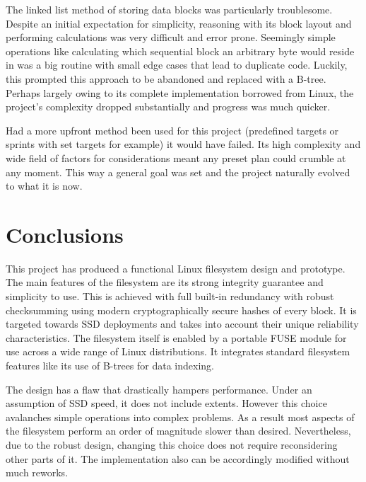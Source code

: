         The linked list method of storing data blocks was particularly
        troublesome. Despite an initial expectation for simplicity, reasoning
        with its block layout and performing calculations was very difficult
        and error prone. Seemingly simple operations like calculating which
        sequential block an arbitrary byte would reside in was a big routine
        with small edge cases that lead to duplicate code. Luckily, this
        prompted this approach to be abandoned and replaced with a B-tree.
        Perhaps largely owing to its complete implementation borrowed from
        Linux, the project's complexity dropped substantially and progress was
        much quicker.

        Had a more upfront method been used for this project (predefined
        targets or sprints with set targets for example) it would have failed. Its high complexity and wide
        field of factors for considerations meant any preset plan could crumble
        at any moment. This way a general goal was set and the project
        naturally evolved to what it is now.

    \section{Conclusions}

        This project has produced a functional Linux filesystem design and
        prototype. The main features of the filesystem are its strong integrity
        guarantee and simplicity to use. This is achieved with full built-in redundancy with robust
        checksumming using modern cryptographically secure hashes of every
        block. It is targeted towards SSD deployments and takes into account
        their unique reliability characteristics. The filesystem itself is
        enabled by a portable FUSE module for use across a wide range of Linux
        distributions. It integrates standard filesystem features like its use
        of B-trees for data indexing.

        The design has a flaw that drastically hampers performance. Under an
        assumption of SSD speed, it does not include extents. However this
        choice avalanches simple operations into complex problems. As a result
        most aspects of the filesystem perform an order of magnitude slower than
        desired. Nevertheless, due to the robust design, changing this choice
        does not require reconsidering other parts of it. The implementation also can be
        accordingly modified without much reworks.


